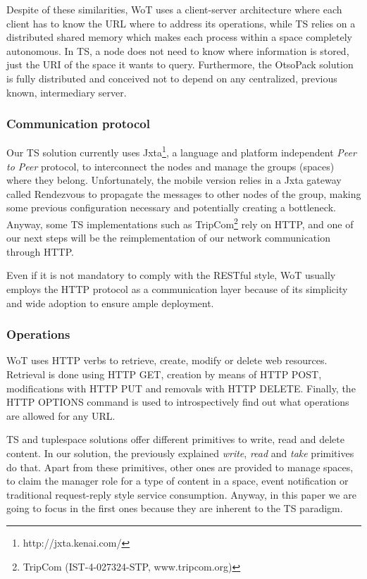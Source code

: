 Despite of these similarities, WoT uses a client-server architecture where each client has to know the URL where to address its operations, while
TS relies on a distributed shared memory which makes each process within a space completely autonomous. In TS, a node does not need to know where
information is stored, just the URI of the space it wants to query. Furthermore, the OtsoPack solution is fully distributed and conceived not to depend
on any centralized, previous known, intermediary server.

\subsubsection{Communication protocol}
Our TS solution currently uses Jxta\footnote{http://jxta.kenai.com/}, a language and platform independent \textit{Peer to Peer} protocol, to
interconnect the nodes and manage the groups (spaces) where they belong. Unfortunately, the mobile version relies in a Jxta gateway called Rendezvous
to propagate the messages to other nodes of the group, making some previous configuration necessary and potentially creating a bottleneck. Anyway,
some TS implementations such as TripCom\footnote{TripCom (IST-4-027324-STP, www.tripcom.org)} rely on HTTP, and one of our next steps will be the
reimplementation of our network communication through HTTP.

Even if it is not mandatory to comply with the RESTful style, WoT usually employs the HTTP protocol as a communication layer because of its
simplicity and wide adoption to ensure ample deployment.

\subsubsection{Operations}
WoT uses HTTP verbs to retrieve, create, modify or delete web resources. Retrieval is done using HTTP GET, creation by means of HTTP POST,
modifications with HTTP PUT and removals with HTTP DELETE. Finally, the HTTP OPTIONS command is used to introspectively find out what operations are
allowed for any URL.

TS and tuplespace solutions offer different primitives to write, read and delete content. In our solution, the previously explained \textit{write},
\textit{read} and \textit{take} primitives do that. Apart from these primitives, other ones are provided to manage spaces, to claim the manager role
for a type of content in a space, event notification or traditional request-reply style service consumption. Anyway, in this paper we are going to focus in the
first ones because they are inherent to the TS paradigm. %

